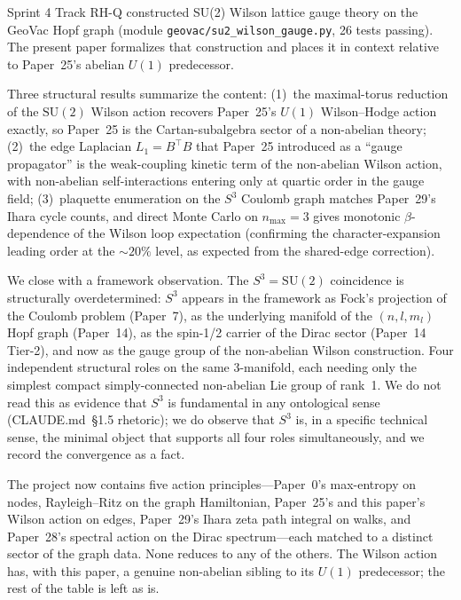 \documentclass[11pt]{article}
\begin{document}
Sprint 4 Track RH-Q constructed SU(2) Wilson lattice gauge theory on
the GeoVac Hopf graph (module \texttt{geovac/su2\_wilson\_gauge.py},
26 tests passing).  The present paper formalizes that construction
and places it in context relative to Paper~25's abelian $U(1)$
predecessor.

Three structural results summarize the content:
(1)~the maximal-torus reduction of the $\mathrm{SU}(2)$ Wilson action
recovers Paper~25's $U(1)$ Wilson--Hodge action exactly, so
Paper~25 is the Cartan-subalgebra sector of a non-abelian theory;
(2)~the edge Laplacian $L_1 = B^{\top} B$ that Paper~25 introduced as
a ``gauge propagator'' is the weak-coupling kinetic term of the
non-abelian Wilson action, with non-abelian self-interactions
entering only at quartic order in the gauge field;
(3)~plaquette enumeration on the $S^3$ Coulomb graph matches
Paper~29's Ihara cycle counts, and direct Monte Carlo on $n_{\max} = 3$
gives monotonic $\beta$-dependence of the Wilson loop expectation
(confirming the character-expansion leading order at the $\sim 20\%$
level, as expected from the shared-edge correction).

We close with a framework observation.  The $S^3 = \mathrm{SU}(2)$
coincidence is structurally overdetermined: $S^3$ appears in the
framework as Fock's projection of the Coulomb problem (Paper~7), as
the underlying manifold of the $(n, l, m_l)$ Hopf graph (Paper~14),
as the spin-1/2 carrier of the Dirac sector (Paper~14 Tier-2), and
now as the gauge group of the non-abelian Wilson construction.  Four
independent structural roles on the same 3-manifold, each needing
only the simplest compact simply-connected non-abelian Lie group of
rank~1.  We do not read this as evidence that $S^3$ is fundamental in
any ontological sense (CLAUDE.md~\S1.5 rhetoric); we do observe that
$S^3$ is, in a specific technical sense, the minimal object that
supports all four roles simultaneously, and we record the convergence
as a fact.

The project now contains five action principles---Paper~0's
max-entropy on nodes, Rayleigh--Ritz on the graph Hamiltonian,
Paper~25's and this paper's Wilson action on edges, Paper~29's Ihara
zeta path integral on walks, and Paper~28's spectral action on the
Dirac spectrum---each matched to a distinct sector of the graph
data.  None reduces to any of the others.  The Wilson action has,
with this paper, a genuine non-abelian sibling to its $U(1)$
predecessor; the rest of the table is left as is.

\end{document}
